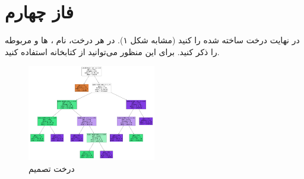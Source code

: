 \documentclass{article}
\begin{document}
	\section{فاز چهارم}
	در نهایت درخت ساخته شده را  کنید (مشابه شکل ۱). در هر  درخت، نام ، ها   و  مربوطه را ذکر کنید. برای این منظور می‌توانید از کتابخانه   استفاده کنید.
	\begin{figure}
		\centerline{\includegraphics[width=0.5\textwidth]{dt-digram.png}}
		\caption{درخت تصمیم}
		\label{fig}
	\end{figure}
	 
	
\end{document}
